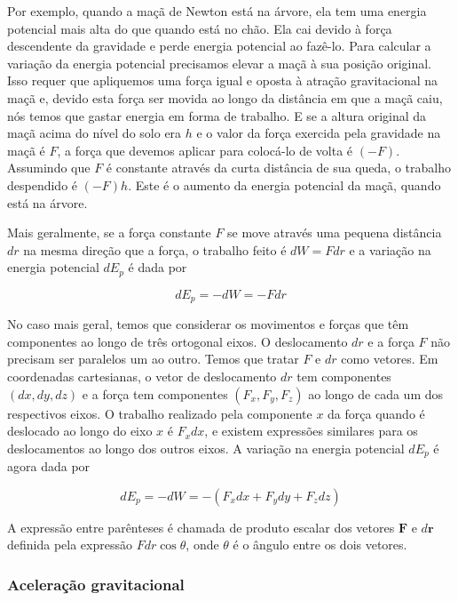 \documentclass[]{book}
\theoremstyle{definition}
\theoremstyle{definition}
\theoremstyle{definition}
\theoremstyle{remark}
\begin{document}
Por exemplo, quando a maçã de Newton está na árvore, ela tem uma energia potencial mais alta do que quando está no chão. Ela cai devido à força descendente da gravidade e perde energia potencial ao fazê-lo. Para calcular a variação da energia potencial precisamos elevar a maçã à sua posição original. Isso requer que apliquemos uma força igual e oposta à atração gravitacional na maçã e, devido esta força ser movida ao longo da distância em que a maçã caiu, nós temos que gastar energia em forma de trabalho. E se a altura original da maçã acima do nível do solo era \(h\) e o valor da força exercida pela gravidade na maçã é \(F\), a força que devemos aplicar para colocá-lo de volta é \((-F)\). Assumindo que \(F\) é constante através da curta distância de sua queda, o trabalho despendido é \((-F) h\). Este é o aumento da energia potencial da maçã, quando está na árvore.

Mais geralmente, se a força constante \(F\) se move através uma pequena distância \(dr\) na mesma direção que a força, o trabalho feito é \(dW= Fdr\) e a variação na energia potencial \(dE_p\) é dada por

\begin{equation}
dE_p = -dW = -Fdr \label{eq:0203}
\end{equation}

No caso mais geral, temos que considerar os movimentos e forças que têm componentes ao longo de três ortogonal eixos. O deslocamento \(dr\) e a força \(F\) não precisam ser paralelos um ao outro. Temos que tratar \(F\) e \(dr\) como vetores. Em coordenadas cartesianas, o vetor de deslocamento \(dr\) tem componentes \((dx, dy, dz)\) e a força tem componentes \((F_x, F_y, F_z)\) ao longo de cada um dos respectivos eixos. O trabalho realizado pela componente \(x\) da força quando é deslocado ao longo do eixo \(x\) é \(F_xdx\), e existem expressões similares para os deslocamentos ao longo dos outros eixos. A variação na energia potencial \(dE_p\) é agora dada por

\begin{equation}
dE_p = -dW = -(F_xdx +F_ydy+F_zdz) \label{eq:0204}
\end{equation}

A expressão entre parênteses é chamada de produto escalar dos vetores \(\mathbf{F}\) e \(d\mathbf{r}\) definida pela expressão \(Fdr\cos{\theta}\), onde \(\theta\) é o ângulo entre os dois vetores.

\hypertarget{aceleracao-gravitacional}{%
\subsubsection{Aceleração gravitacional}\label{aceleracao-gravitacional}}
\end{document}
